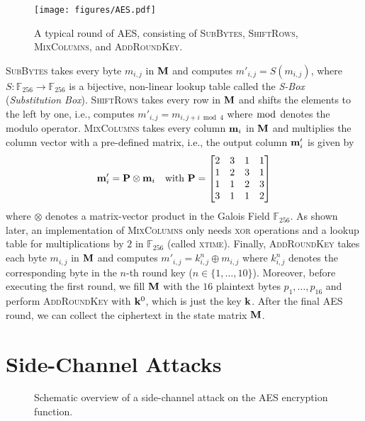 \begin{figure}[ht]
    \centering
	\texttt{[image: figures/AES.pdf]}
    \caption{A typical round of AES, consisting of \textsc{SubBytes}, \textsc{ShiftRows}, \textsc{MixColumns}, and \textsc{AddRoundKey}.}
    \label{fig:aes_description}
\end{figure}

\textsc{SubBytes} takes every byte $m_{i,j}$ in $\mathbf{M}$ and computes $m'_{i,j} = S(m_{i,j})$, where $S: \mathbb{F}_{256} \to \mathbb{F}_{256}$ is a bijective, non-linear lookup table called the \emph{S-Box} (\emph{Substitution Box}). \textsc{ShiftRows} takes every row in $\mathbf{M}$ and shifts the elements to the left by one, i.e., computes $m'_{i,j} = m_{i, j+i \bmod 4}$ where $\bmod$ denotes the modulo operator. \textsc{MixColumns} takes every column $\mathbf{m}_i$ in $\mathbf{M}$ and multiplies the column vector with a pre-defined matrix, i.e., the output column $\mathbf{m}'_i$ is given by
\begin{align}
    \mathbf{m}'_i = \mathbf{P} \otimes \mathbf{m}_i \quad \text{with } \mathbf{P} = 
    \begin{bmatrix}
        2 & 3 & 1 & 1 \\
        1 & 2 & 3 & 1 \\
        1 & 1 & 2 & 3 \\
        3 & 1 & 1 & 2
    \end{bmatrix}
\end{align}
where $\otimes$ denotes a matrix-vector product in the Galois Field $\mathbb{F}_{256}$. As shown later, an implementation of \textsc{MixColumns} only needs \textsc{xor} operations and a lookup table for multiplications by $2$ in $\mathbb{F}_{256}$ (called \textsc{xtime}).
Finally, \textsc{AddRoundKey} takes each byte $m_{i,j}$ in $\mathbf{M}$ and computes $m'_{i,j} = k^n_{i,j} \oplus m_{i,j}$ where $k^n_{i,j}$ denotes the corresponding byte in the $n$-th round key ($n \in \{1,\dots,10\}$).
Moreover, before executing the first round, we fill $\mathbf{M}$ with the $16$ plaintext bytes $p_1,\dots,p_{16}$ and perform \textsc{AddRoundKey} with $\mathbf{k}^0$, which is just the key $\mathbf{k}$. After the final AES round, we can collect the ciphertext in the state matrix $\mathbf{M}$.

\section{Side-Channel Attacks}
\begin{figure}[ht]
    \centering
    \makebox[\textwidth][c]{
        \scalebox{0.85}{
            
        }
    }%

    \caption{Schematic overview of a side-channel attack on the AES encryption function.}
    \label{fig:sca}
\end{figure}

